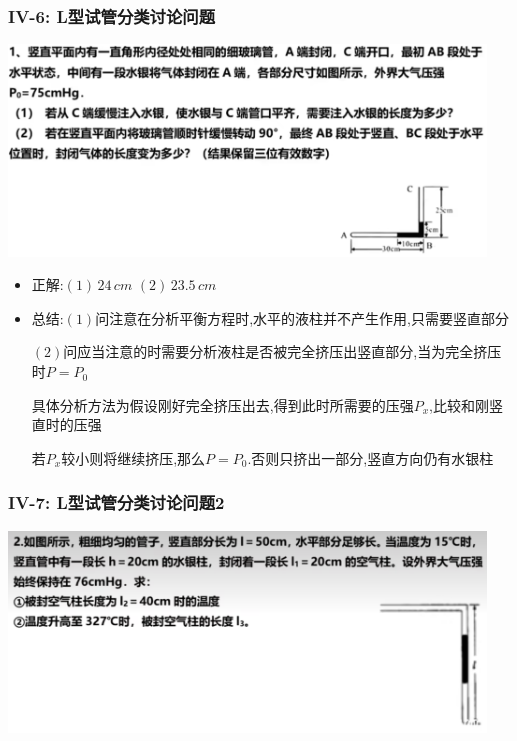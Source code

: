 \documentclass{article}
\begin{document}
\vspace{2em}

\subsubsection{IV-6: L型试管分类讨论问题}
\includegraphics[width = 0.95\textwidth,keepaspectratio]{./pictures/2.3-17.png}

\begin{itemize}
    \item 正解:\quad $(1) \, 24 \, cm$  $(2) \, 23.5 \, cm $
    \item 总结:\quad $(1)$问注意在分析平衡方程时,水平的液柱并不产生作用,只需要竖直部分

          \hspace{3.2em}$(2)$问应当注意的时需要分析液柱是否被完全挤压出竖直部分,当为完全挤压时$P = P_{0}$

          \hspace{3.2em}具体分析方法为假设刚好完全挤压出去,得到此时所需要的压强$P_{x}$,比较和刚竖直时的压强

          \hspace{3.2em}若$P_{x}$较小则将继续挤压,那么$P = P_{0}$.否则只挤出一部分,竖直方向仍有水银柱
\end{itemize}

\vspace{2em}

\subsubsection{IV-7: L型试管分类讨论问题2}
\includegraphics[width = 0.95\textwidth,keepaspectratio]{./pictures/2.3-18.png}
\end{document}
